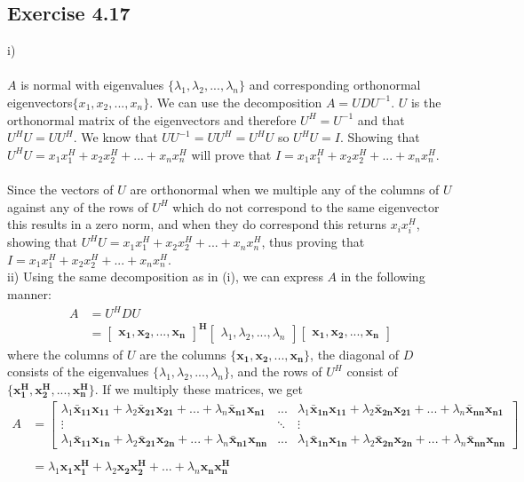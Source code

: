 \documentclass[letterpaper,12pt]{article}
\theoremstyle{definition}
\begin{document}
\subsection*{Exercise 4.17}
i) \\ \\
$A$ is normal with eigenvalues $\{\lambda_{1},\lambda_{2},...,\lambda_{n}\}$ and corresponding orthonormal eigenvectors$\{x_{1}, x_{2},..., x_{n}\}$. We can use the decomposition $A = UDU^{-1}$. $U$ is the orthonormal matrix of the eigenvectors and therefore $U^{H}=U^{-1}$ and that$U^{H}U = UU^{H}$. We know that $UU^{-1} = UU^{H} = U^{H}U$ so $U^{H}U = I$. Showing that $U^{H}U = x_{1}x_{1}^{H} + x_{2}x_{2}^{H} + ... + x_{n}x_{n}^{H}$ will prove that $I = x_{1}x_{1}^{H} + x_{2}x_{2}^{H} + ... + x_{n}x_{n}^{H}$. \\ \\
Since the vectors of $U$ are orthonormal when we multiple any of the columns of $U$ against any of the rows of $U^{H}$ which do not correspond to the same eigenvector this results in a zero norm, and when they do correspond this returns $x_{i}x_{i}^{H}$, showing that $U^{H}U = x_{1}x_{1}^{H} + x_{2}x_{2}^{H} + ... + x_{n}x_{n}^{H}$, thus proving that $I = x_{1}x_{1}^{H} + x_{2}x_{2}^{H} + ... + x_{n}x_{n}^{H}$. \\ 

ii) Using the same decomposition as in (i), we can express $A$ in the following manner:
\begin{align*}A &= U^HDU\\
& = \begin{bmatrix}
\mathbf{x_1, x_2, ..., x_n}\end{bmatrix}^{\mathbf{H}}
\begin{bmatrix}
{\lambda_1, \lambda_2, ..., \lambda_n}
\end{bmatrix}
\begin{bmatrix}
\mathbf{x_1, x_2, ..., x_n}\end{bmatrix}
\end{align*}
where the columns of $U$ are the columns $\{\mathbf{x_1, x_2, ..., x_n}\}$, the diagonal of $D$ consists of the eigenvalues $\{\lambda_1, \lambda_2, ..., \lambda_n\}$, and the rows of $U^H$ consist of $\{\mathbf{x_1^H, x_2^H, ..., x_n^H}\}$. If we multiply these matrices, we get 
\begin{align*} A &= \begin{bmatrix}
\lambda_1\mathbf{\bar{x}_{11}x_{11}} + \lambda_2\mathbf{\bar{x}_{21}x_{21}} +...+ \lambda_n\mathbf{\bar{x}_{n1}x_{n1}} & ... & 
\lambda_1\mathbf{\bar{x}_{1n}x_{11}} + \lambda_2\mathbf{\bar{x}_{2n}x_{21}} +...+\lambda_n\mathbf{\bar{x}_{nn}x_{n1}} \\
\vdots&\ddots&\vdots\\
\lambda_1\mathbf{\bar{x}_{11}x_{1n}} + \lambda_2\mathbf{\bar{x}_{21}x_{2n}} +...+\lambda_n\mathbf{\bar{x}_{n1}x_{nn}} & ... &
\lambda_1\mathbf{\bar{x}_{1n}x_{1n}} + \lambda_2\mathbf{\bar{x}_{2n}x_{2n}} +...+ \lambda_n\mathbf{\bar{x}_{nn}x_{nn}} 
\end{bmatrix}\\
\\
&= \lambda_1 \mathbf{x_1x_1^H} + \lambda_2 \mathbf{x_2x_2^H} + ... + \lambda_n \mathbf{x_nx_n^H}
\end{align*}
\end{document}

